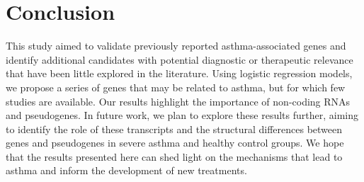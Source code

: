 \section{Conclusion}

This study aimed to validate previously reported asthma-associated genes and identify additional candidates with potential diagnostic or therapeutic relevance that have been little explored in the literature. Using logistic regression models, we propose a series of genes that may be related to asthma, but for which few studies are available. Our results highlight the importance of non-coding RNAs and pseudogenes. In future work, we plan to explore these results further, aiming to identify the role of these transcripts and the structural differences between genes and pseudogenes in severe asthma and healthy control groups. We hope that the results presented here can shed light on the mechanisms that lead to asthma and inform the development of new treatments.
